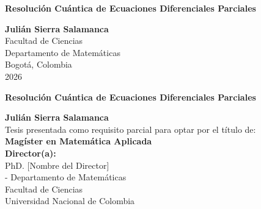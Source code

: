 \documentclass[10pt,spanish,openany,twoside,letterpaper]{book}
\newcommand{\studentname}{}
\newcommand{\academictitle}{}
\newcommand{\thesisname}{}
\newcommand{\director}{}
\newcommand{\directortitle}{}
\newcommand{\issuedate}{}
\newcommand{\sede}{}
\newcommand{\department}{}
\newcommand{\departmenttwo}{} %
\newcommand{\faculty}{}
\newcommand{\university}{Universidad Nacional de Colombia}
\renewcommand{\studentname}{Julián Sierra Salamanca}
\renewcommand{\thesisname}{Resolución Cuántica de Ecuaciones Diferenciales Parciales}
\renewcommand{\issuedate}{2026}
\renewcommand{\director}{PhD. [Nombre del Director]}
\renewcommand{\directortitle}{[Indicar si es Profesor Titular/Asociado]}
\renewcommand{\academictitle}{Magíster en Matemática Aplicada}
\renewcommand{\sede}{Bogotá}
\renewcommand{\department}{Departamento de Matemáticas}
\renewcommand{\departmenttwo}{Departamento de Matemáticas}
\renewcommand{\faculty}{Facultad de Ciencias}
\renewcommand{\baselinestretch}{1}
\begin{document}
\renewcommand{\listfigurename}{\sffamily Lista de figuras}
\renewcommand{\listtablename}{\sffamily Lista de tablas}
\renewcommand{\contentsname}{\sffamily Contenido}
\renewcommand{\chaptername}{\sffamily Capítulo}
\renewcommand{\tablename}{\scriptsize \centering \textbf{Tabla}}
\renewcommand{\figurename}{\scriptsize \centering \textbf{Figura}}
\renewcommand{\appendixname}{\sffamily Anexo}

\renewcommand{\bibname}{\sffamily Referencias Bibliográficas}

{\newpage
\thispagestyle{empty}
\begin{center}
\begin{figure}
\centering
{}%
\end{figure}
\vspace{2.5cm}
{\Huge\bfseries\renewcommand{\baselinestretch}{1.3}\selectfont \thesisname\par} %
\vspace{2.5cm}
\textbf{\Large \studentname} \\
\vspace{5.0cm}
\faculty \\ \department \\
\sede, Colombia\\
\issuedate
\newpage 
\thispagestyle{empty}
\vspace{2.0cm}
{\Huge\bfseries\renewcommand{\baselinestretch}{1.3}\selectfont \thesisname\par} %
\vspace{2.0cm}
\textbf{\Large \studentname} \\
\vspace{2.0cm}
\small Tesis presentada como requisito parcial para optar por el título de: \\
{\bfseries \academictitle}\\
\vspace{2.0cm}
\textbf{Director(a):} \\
\director \\
\directortitle \; - \departmenttwo \\
\faculty \\
\university \\ 

\end{center}}
\end{document}
